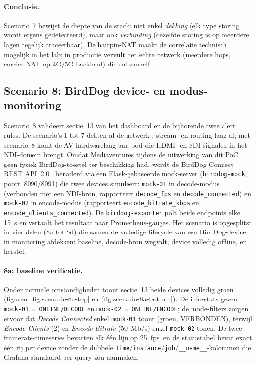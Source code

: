 \paragraph{Conclusie.}
Scenario~7 bewijst de diepte van de stack: niet enkel \emph{dekking} (elk type storing wordt ergens gedetecteerd), maar ook \emph{verbinding} (dezelfde storing is op meerdere lagen tegelijk traceerbaar). De hairpin-NAT maakt de correlatie technisch mogelijk in het lab; in productie vervult het echte netwerk (meerdere hops, carrier NAT op 4G/5G-backhaul) die rol vanzelf.

\subsection{Scenario 8: BirdDog device- en modus-monitoring}
\label{sec:scenario-8}

Scenario~8 valideert sectie~13 van het dashboard en de bijhorende twee alert rules. De scenario's 1 tot 7 dekten al de netwerk-, stream- en routing-laag af; met scenario~8 komt de AV-hardwarelaag aan bod die HDMI- en SDI-signalen in het NDI-domein brengt. Omdat Mediaventures tijdens de uitwerking van dit PoC geen fysiek BirdDog-toestel ter beschikking had, wordt de BirdDog Connect REST API~2.0~\autocite{BirdDogAPI2024} benaderd via een Flask-gebaseerde mock-server (\texttt{birddog-mock}, poort~8090/8091) die twee devices simuleert: \texttt{mock-01} in decode-modus (verbonden met een NDI-bron, rapporteert \texttt{decode\_fps} en \texttt{decode\_connected}) en \texttt{mock-02} in encode-modus (rapporteert \texttt{encode\_bitrate\_kbps} en \texttt{encode\_clients\_connected}). De \texttt{birddog-exporter} polt beide endpoints elke 15~s en vertaalt het resultaat naar Prometheus-gauges. Het scenario is opgesplitst in vier delen (8a tot 8d) die samen de volledige lifecycle van een BirdDog-device in monitoring afdekken: baseline, decode-bron wegvalt, device volledig offline, en herstel.

\paragraph{8a: baseline verificatie.} Onder normale omstandigheden toont sectie~13 beide devices volledig groen (figuren~\ref{fig:scenario-8a-top} en~\ref{fig:scenario-8a-bottom}). De info-stats geven \texttt{mock-01 = ONLINE/DECODE} en \texttt{mock-02 = ONLINE/ENCODE}; de mode-filters zorgen ervoor dat \emph{Decode Connected} enkel \texttt{mock-01} toont (groen, VERBONDEN), terwijl \emph{Encode Clients} (2) en \emph{Encode Bitrate} (50~Mb/s) enkel \texttt{mock-02} tonen. De twee framerate-timeseries bevatten elk één lijn op 25~fps, en de statustabel bevat exact één rij per device zonder de dubbele \texttt{Time}/\texttt{instance}/\texttt{job}/\texttt{\_\_name\_\_}-kolommen die Grafana standaard per query zou aanmaken.

